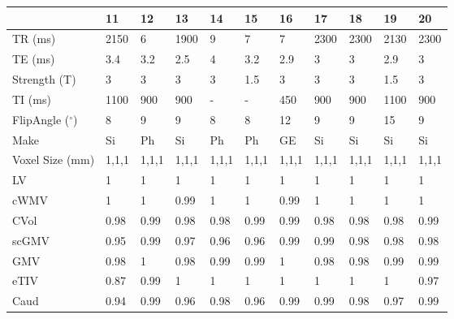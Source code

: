 \begin{table}
[]
\centering
\begin{tabular}{lllllllllll}
\toprule
{} &     11 &     12 &     13 &     14 &     15 &     16 &     17 &     18 &     19 &     20 \\
\midrule
TR (ms)                            &   2150 &      6 &   1900 &      9 &      7 &      7 &   2300 &   2300 &   2130 &   2300 \\
TE (ms)                           &    3.4 &    3.2 &    2.5 &      4 &    3.2 &    2.9 &      3 &      3 &    2.9 &      3 \\
Strength (T)                      &      3 &      3 &      3 &      3 &    1.5 &      3 &      3 &      3 &    1.5 &      3 \\
TI (ms)                           &   1100 &      900 &    900 &      - &      - &    450 &    900 &    900 &   1100 &    900 \\
FlipAngle ($^{\circ}$)                     &      8 &      9 &      9 &      8 &      8 &     12 &      9 &      9 &     15 &      9 \\
Make                          &     Si &     Ph &     Si &     Ph &     Ph &     GE &     Si &     Si &     Si &     Si \\
Voxel Size (mm)                    &  1,1,1 &  1,1,1 &  1,1,1 &  1,1,1 &  1,1,1 &  1,1,1 &  1,1,1 &  1,1,1 &  1,1,1 &  1,1,1 \\
\bottomrule
LV             &      1 &      1 &      1 &      1 &      1 &      1 &      1 &      1 &      1 &      1 \\
cWMV        &      1 &      1 &   0.99 &      1 &      1 &   0.99 &      1 &      1 &      1 &      1 \\
CVol                     &   0.98 &   0.99 &   0.98 &   0.98 &   0.99 &   0.99 &   0.98 &   0.98 &   0.98 &   0.99 \\
scGMV                &   0.95 &   0.99 &   0.97 &   0.96 &   0.96 &   0.99 &   0.99 &   0.98 &   0.98 &   0.98 \\
GMV                  &   0.98 &      1 &   0.98 &   0.99 &   0.99 &      1 &   0.98 &   0.98 &   0.99 &   0.99 \\
eTIV &   0.87 &   0.99 &      1 &      1 &      1 &      1 &      1 &      1 &      1 &   0.97 \\
Caud                       &   0.94 &   0.99 &   0.96 &   0.98 &   0.96 &   0.99 &   0.99 &   0.98 &   0.97 &   0.99 \\

\end{tabular}
\end{table}
